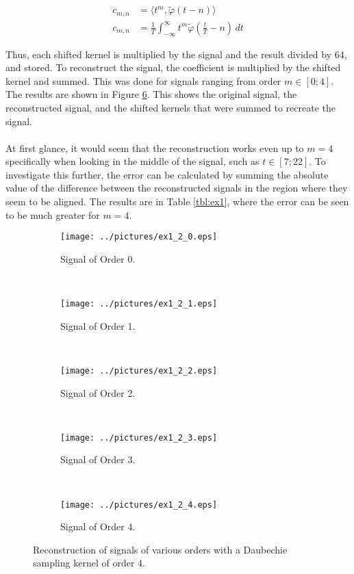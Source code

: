 \documentclass[11pt,a4paper]{report}
\begin{document}
\begin{align}
    c_{m,n} &= \langle t^m, \tilde{\varphi}(t - n)\rangle\label{eq:coefficient}\\
    c_{m,n} &= \frac{1}{T} \int_{-\infty}^{\infty} t^m \tilde{\varphi} \left( \frac{t}{T} -n \right) \,dt \label{eq:constant}
\end{align}

Thus, each shifted kernel is multiplied by the signal and the result divided by 64, and stored. To reconstruct the signal, the coefficient is multiplied by the shifted kernel and summed. This was done for signals ranging from order $m \in [0; 4]$. The results are shown in Figure \ref{fig:ex1_2}. This shows the original signal, the reconstructed signal, and the shifted kernels that were summed to recreate the signal.
\\\\
At first glance, it would seem that the reconstruction works even up to $m=4$ specifically when looking in the middle of the signal, such as $t \in [7; 22]$. To investigate this further, the error can be calculated by summing the absolute value of the difference between the reconstructed signals in the region where they seem to be aligned. The results are in Table \ref{tbl:ex1}, where the error can be seen to be much greater for $m=4$.

\begin{figure}[!ht]
    \captionsetup[subfigure]{position=b}
    \centering
    \begin{subfigure}{0.49\textwidth}
        \texttt{[image: ../pictures/ex1\_2\_0.eps]}
        \caption{Signal of Order 0.}
        \label{fig:ex1_2_0}
    \end{subfigure}
    ~
    \begin{subfigure}{0.49\textwidth}
        \texttt{[image: ../pictures/ex1\_2\_1.eps]}
        \caption{Signal of Order 1.}
        \label{fig:ex1_2_1}
    \end{subfigure}
    \\
    \begin{subfigure}{0.49\textwidth}
        \texttt{[image: ../pictures/ex1\_2\_2.eps]}
        \caption{Signal of Order 2.}
        \label{fig:ex1_2_2}
    \end{subfigure}
    ~
    \begin{subfigure}{0.49\textwidth}
        \texttt{[image: ../pictures/ex1\_2\_3.eps]}
        \caption{Signal of Order 3.}
        \label{fig:ex1_2_3}
    \end{subfigure}
    \\
    \begin{subfigure}{0.75\textwidth}
        \texttt{[image: ../pictures/ex1\_2\_4.eps]}
        \caption{Signal of Order 4.}
        \label{fig:ex1_2_4}
    \end{subfigure}

    \caption{Reconstruction of signals of various orders with a Daubechie sampling kernel of order 4.}
    \label{fig:ex1_2}
\end{figure}
\end{document}
